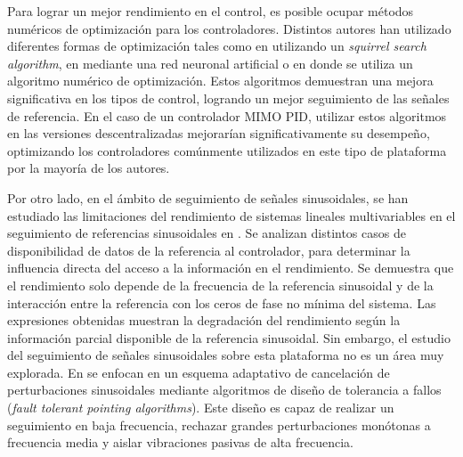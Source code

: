 Para lograr un mejor rendimiento en el control, es posible ocupar métodos numéricos de optimización para los controladores. Distintos autores han utilizado diferentes formas de optimización tales como en \cite{choubey2021optimized} utilizando un \textit{squirrel search algorithm}, en \cite{tajdari2021optimizer} mediante una red neuronal artificial o en \cite{silva2006lqr} donde se utiliza un algoritmo numérico de optimización. Estos algoritmos demuestran una mejora significativa en los tipos de control, logrando un mejor seguimiento de las señales de referencia. En el caso de un controlador MIMO PID, utilizar estos algoritmos en las versiones descentralizadas mejorarían significativamente su desempeño, optimizando los controladores comúnmente utilizados en este tipo de plataforma por la mayoría de los autores.

Por otro lado, en el ámbito de seguimiento de señales sinusoidales, se han estudiado las limitaciones del rendimiento de sistemas lineales multivariables en el seguimiento de referencias sinusoidales en \cite{su2003performance,su2005performance,su2009performance}. Se analizan distintos casos de disponibilidad de datos de la referencia al controlador, para determinar la influencia directa del acceso a la información en el rendimiento. Se demuestra que el rendimiento solo depende de la frecuencia de la referencia sinusoidal y de la interacción entre la referencia con los ceros de fase no mínima del sistema. Las expresiones obtenidas muestran la degradación del rendimiento según la información parcial disponible de la referencia sinusoidal. Sin embargo, el estudio del seguimiento de señales sinusoidales sobre esta plataforma no es un área muy explorada. En \cite{lin2003sinusoidal} se enfocan en un esquema adaptativo de cancelación de perturbaciones sinusoidales mediante algoritmos de diseño de tolerancia a fallos (\textit{fault tolerant pointing algorithms}). Este diseño es capaz de realizar un seguimiento en baja frecuencia, rechazar grandes perturbaciones monótonas a frecuencia media y aislar vibraciones pasivas de alta frecuencia.  

